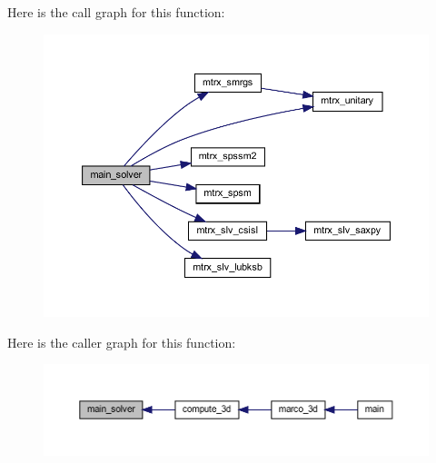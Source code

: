 Here is the call graph for this function\+:
\nopagebreak
\begin{figure}[H]
\begin{center}
\leavevmode
\includegraphics[width=350pt]{Marco_8f90_a212d574f24aa10a6e92151f2b35d968e_cgraph}
\end{center}
\end{figure}
Here is the caller graph for this function\+:
\nopagebreak
\begin{figure}[H]
\begin{center}
\leavevmode
\includegraphics[width=350pt]{Marco_8f90_a212d574f24aa10a6e92151f2b35d968e_icgraph}
\end{center}
\end{figure}
\mbox{\label{Marco_8f90_ab4072d7c3398c241c49159b987685a55}} 
